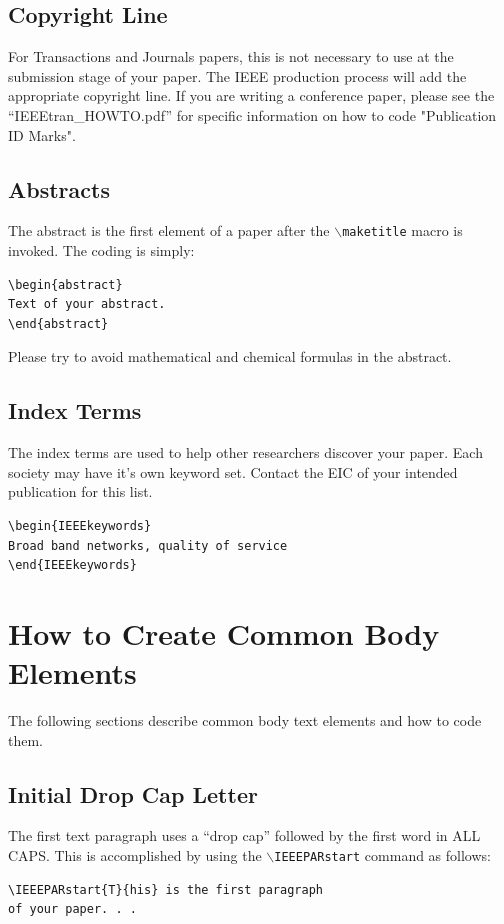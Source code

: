 \documentclass[lettersize,journal]{IEEEtran}
\begin{document}
\subsection{Copyright Line}
\noindent For Transactions and Journals papers, this is not necessary to use at the submission stage of your paper. The IEEE production process will add the appropriate copyright line. If you are writing a conference paper, please see the ``IEEEtran\_HOWTO.pdf'' for specific information on how to code "Publication ID Marks".

\subsection{Abstracts}
\noindent The abstract is the first element of a paper after the $\backslash${\tt{maketitle}} macro is invoked.  The coding is simply:
\begin{verbatim}
\begin{abstract}
Text of your abstract.
\end{abstract}
\end{verbatim}
Please try to avoid mathematical and chemical formulas in the abstract.

\subsection{Index Terms}
\noindent The index terms are used to help other researchers discover your paper. Each society may have it's own keyword set. Contact the EIC of your intended publication for this list.
\begin{verbatim}
\begin{IEEEkeywords}
Broad band networks, quality of service
\end{IEEEkeywords}
\end{verbatim}
\section{How to Create Common Body Elements}
\noindent The following sections describe common body text elements and how to code them.

\subsection{Initial Drop Cap Letter}
\noindent The first text paragraph uses a ``drop cap'' followed by the first word in ALL CAPS. This is accomplished by using the $\backslash${\tt{IEEEPARstart}} command as follows:
\begin{verbatim}
\IEEEPARstart{T}{his} is the first paragraph 
of your paper. . .
\end{verbatim}
\end{document}
